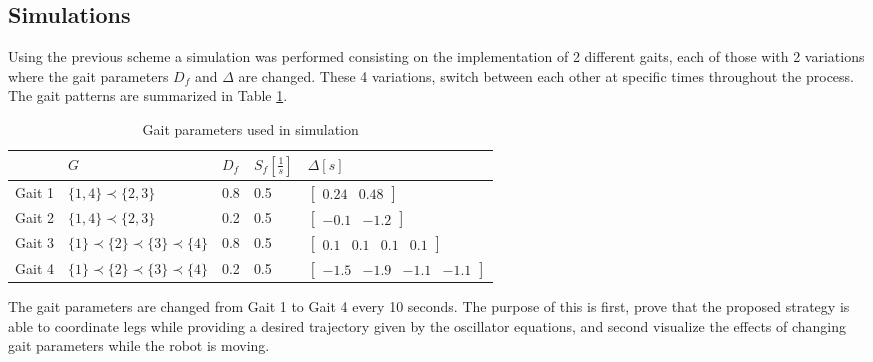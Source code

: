 \documentclass[main.tex]{subfiles}
\begin{document}
\subsection{Simulations}
Using the previous scheme a simulation was performed consisting on the implementation of 2 different gaits, each of those with 2 variations where the gait parameters $D_f$ and $\Delta$ are changed. These 4 variations, switch between each other at specific times throughout the process. The gait patterns are summarized in Table \ref{Table:GaitParameters}.
\begin{table}[b]
\centering
\caption{Gait parameters used in simulation}
\label{Table:GaitParameters}
\begin{tabular}{|l|l|l|l|l|}
\hline
       & $G$                                   & $D_f$ & $S_f[\frac{1}{s}]$ & $\Delta[s]$                                                 \\ \hline
Gait 1 & $\{1,4\}\prec\{2,3\}$                 & 0.8  & 0.5        & $\begin{bmatrix} 0.24 & 0.48\end{bmatrix}$               \\ \hline
Gait 2 & $\{1,4\}\prec\{2,3\}$                 & 0.2  & 0.5        & $\begin{bmatrix} -0.1 &-1.2\end{bmatrix}$                \\ \hline
Gait 3 & $\{1\}\prec\{2\}\prec\{3\}\prec\{4\}$ & 0.8  & 0.5        & $\begin{bmatrix} 0.1 & 0.1 & 0.1 & 0.1\end{bmatrix}$     \\ \hline
Gait 4 & $\{1\}\prec\{2\}\prec\{3\}\prec\{4\}$ & 0.2  & 0.5        & $\begin{bmatrix} -1.5 & -1.9 & -1.1 & -1.1\end{bmatrix}$ \\ \hline
\end{tabular}
\end{table}
The gait parameters are changed from Gait 1 to Gait 4 every 10 seconds. The purpose of this is first, prove that the proposed strategy is able to coordinate legs while providing a desired trajectory given by the oscillator equations, and second visualize the effects of changing gait parameters while the robot is moving. 
\end{document}
